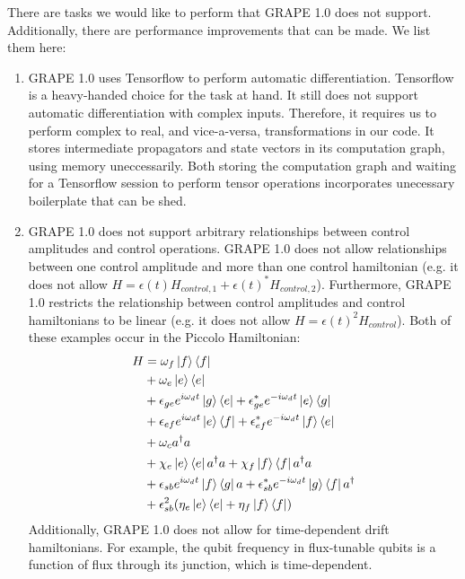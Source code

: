\documentclass[letterpaper, 12pt]{article}
\begin{document}
There are tasks we would like to perform that GRAPE 1.0 \cite{leung2017speedup} does not support. Additionally, there are performance improvements that can be made. We list them here:
\begin{enumerate}
\item GRAPE 1.0 uses Tensorflow to perform automatic differentiation. Tensorflow is a heavy-handed choice for the task at hand. It still does not support automatic differentiation with complex inputs. Therefore, it requires us to perform complex to real, and vice-a-versa, transformations in our code. It stores intermediate propagators and state vectors in its computation graph, using memory uneccessarily. Both storing the computation graph and waiting for a Tensorflow session to perform tensor operations incorporates unecessary boilerplate that can be shed.
  
\item GRAPE 1.0 does not support arbitrary relationships between control amplitudes and control operations. GRAPE 1.0 does not allow relationships between one control amplitude and more than one control hamiltonian (e.g. it does not allow $H = \epsilon(t)H_{control, 1} + \epsilon(t)^{*}H_{control, 2}$). Furthermore, GRAPE 1.0 restricts the relationship between control amplitudes and control hamiltonians to be linear (e.g. it does not allow $H = \epsilon(t)^{2}H_{control}$). Both of these examples occur in the Piccolo Hamiltonian:
\begin{align*}
  H &= \omega_{f}\ket{f}\bra{f} \\
  &+ \omega_{e}\ket{e}\bra{e}\\
  &+ \epsilon_{ge}e^{i\omega_{d}t}\ket{g}\bra{e} + \epsilon_{ge}^{*}e^{-i\omega_{d}t}\ket{e}\bra{g}\\
  &+ \epsilon_{ef}e^{i\omega_{d}t}\ket{e}\bra{f} + \epsilon_{ef}^{*}e^{-i\omega_{d}t}\ket{f}\bra{e}\\
  &+ \omega_{c}a^{\dagger}a\\
  &+ \chi_{e}\ket{e}\bra{e}a^{\dagger}a + \chi_{f}\ket{f}\bra{f}a^{\dagger}a\\
  &+ \epsilon_{sb}e^{i\omega_{d}t}\ket{f}\bra{g}a + \epsilon_{sb}^{*}e^{-i\omega_{d}t}\ket{g}\bra{f}a^{\dagger}\\
  &+ \epsilon_{sb}^{2}(\eta_{e}\ket{e}\bra{e} + \eta_{f}\ket{f}\bra{f})\\
\end{align*}
  Additionally, GRAPE 1.0 does not allow for time-dependent drift hamiltonians. For example, the qubit frequency in flux-tunable qubits is a function of flux through its junction, which is time-dependent.


\end{enumerate}
\end{document}

